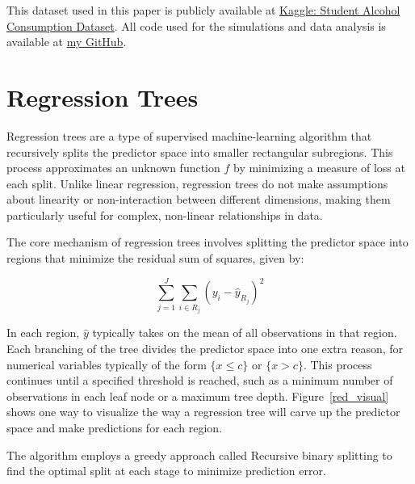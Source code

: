 \documentclass[12pt]{article}
\begin{document}
This dataset used in this paper is publicly available at \href{https://www.kaggle.com/datasets/uciml/student-alcohol-consumption}{Kaggle: Student Alcohol Consumption Dataset}. All code used for the simulations and data analysis is available at \href{https://github.com/Tim2othy/wissenschaftliches-arbeiten}{my GitHub}.


\section{Regression Trees}

Regression trees are a type of supervised machine-learning algorithm that recursively splits the predictor space into smaller rectangular subregions. This process approximates an unknown function $f$ by minimizing a measure of loss at each split. Unlike linear regression, regression trees do not make assumptions about linearity or non-interaction between different dimensions, making them particularly useful for complex, non-linear relationships in data.

The core mechanism of regression trees involves splitting the predictor space into regions that minimize the residual sum of squares, given by:

\begin{equation}
    \sum_{j=1}^{J} \sum_{i \in R_j} ( y_i- \hat{y}_{R_j})^2
\end{equation}

In each region, $\hat{y}$ typically takes on the mean of all observations in that region. Each branching of the tree divides the predictor space into one extra reason, for numerical variables typically of the form $\{x \le c\}$ or $\{x > c\}$. This process continues until a specified threshold is reached, such as a minimum number of observations in each leaf node or a maximum tree depth. Figure~\ref{red_visual} shows one way to visualize the way a regression tree will carve up the predictor space and make predictions for each region.

The algorithm employs a greedy approach called Recursive binary splitting to find the optimal split at each stage to minimize prediction error.
\end{document}
